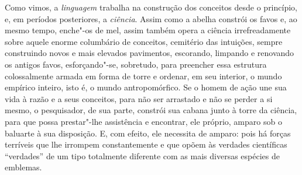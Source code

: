 \sectionitem
Como vimos, a \textit{linguagem} trabalha na construção dos conceitos
desde o princípio, e, em períodos posteriores, a \textit{ciência}.
Assim como a abelha constrói os favos e, ao mesmo tempo, enche"-os de
mel, assim também opera a ciência irrefreadamente sobre aquele enorme
columbário de conceitos, cemitério das intuições, sempre construindo
novos e mais elevados pavimentos, escorando, limpando e renovando os
antigos favos, esforçando"-se, sobretudo, para preencher essa
estrutura colossalmente armada em forma de torre e ordenar, em seu
interior, o mundo empírico inteiro, isto é, o mundo antropomórfico. Se
o homem de ação une sua vida à razão e a seus conceitos, para não ser
arrastado e não se perder a si mesmo, o pesquisador, de sua parte,
constrói sua cabana junto à torre da ciência, para que possa
prestar"-lhe assistência e encontrar, ele próprio, amparo sob o
baluarte à sua disposição. E, com efeito, ele necessita de amparo: pois
há forças terríveis que lhe irrompem constantemente e que opõem às
verdades científicas “verdades” de um tipo totalmente diferente com as
mais diversas espécies de emblemas.

